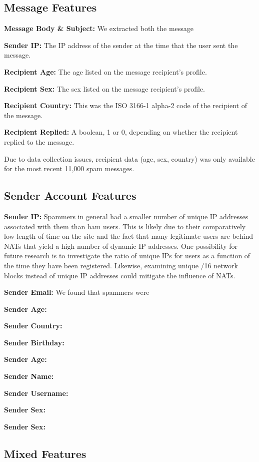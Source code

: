 \documentclass[preprint]{acm_proc_article-sp}
\begin{document}
\subsection{Message Features}

\textbf{Message Body \& Subject:} We extracted both the message 

\textbf{Sender IP:} The IP address of the sender at the time that the user sent the message. 

\textbf{Recipient Age:} The age listed on the message recipient's profile.

\textbf{Recipient Sex:} The sex listed on the message recipient's profile.

\textbf{Recipient Country:} This was the ISO 3166-1 alpha-2 code of the recipient of the message. 

\textbf{Recipient Replied:} A boolean, 1 or 0, depending on whether the recipient replied to the message.

Due to data collection issues, recipient data (age, sex, country) was only available for the most recent 11,000 spam messages.


\subsection{Sender Account Features}

\textbf{Sender IP:} Spammers in general had a smaller number of unique IP addresses associated with them than ham users. This is likely due to their comparatively low length of time on the site and the fact that many legitimate users are behind NATs that yield a high number of dynamic IP addresses. One possibility for future research is to investigate the ratio of unique IPs for users as a function of the time they have been registered. Likewise, examining unique /16 network blocks instead of unique IP addresses could mitigate the influence of NATs.

\textbf{Sender Email:} We found that spammers were 

\textbf{Sender Age:}

\textbf{Sender Country:}

\textbf{Sender Birthday:}

\textbf{Sender Age:}

\textbf{Sender Name:}

\textbf{Sender Username:}

\textbf{Sender Sex:}

\textbf{Sender Sex:}

\subsection{Mixed Features}
\end{document}
